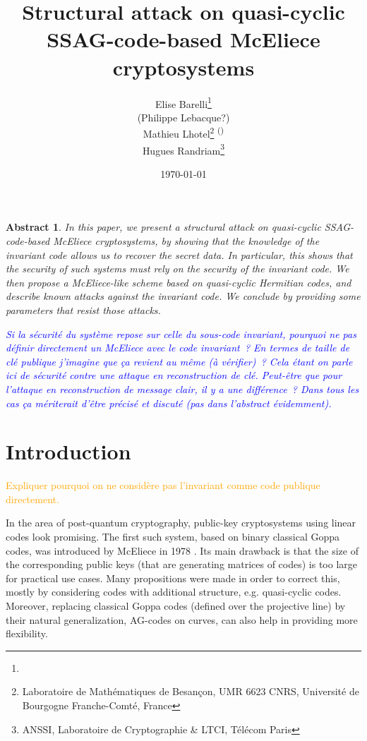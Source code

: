 \documentclass[10pt]{article}
\title{Structural attack on quasi-cyclic SSAG-code-based McEliece cryptosystems}
\author{
Elise Barelli\footnote{}\\
(Philippe Lebacque?)\\
Mathieu Lhotel\footnote{Laboratoire de Mathématiques de Besançon, UMR 6623 CNRS, Université de Bourgogne Franche-Comté, France} \textsuperscript{(\Letter)}\\
Hugues Randriam\footnote{ANSSI, Laboratoire de Cryptographie \& LTCI, Télécom Paris}
}
\date{\today}
\newtheorem*{abs}{Abstract}
\theoremstyle{definition}
\theoremstyle{definition}
\theoremstyle{definition}
\newcommand{\s}{\vspace{0.3cm}}
\newcommand{\hugues}[1]{\textcolor{blue}{#1}}
\newcommand{\note}[1]{\textcolor{orange}{#1}}
\begin{document}
\maketitle

\begin{abs} 
 In this paper, we present a structural attack on quasi-cyclic SSAG-code-based McEliece cryptosystems, by showing that the knowledge of the invariant code allows us to recover the secret data. In particular, this shows that the security of such systems must rely on the security of the invariant code. We then propose a McEliece-like scheme based on quasi-cyclic Hermitian codes, and describe known attacks against the invariant code. We conclude by providing some parameters that resist those attacks.

\hugues{
Si la sécurité du système repose sur celle du sous-code invariant, pourquoi ne pas définir directement un McEliece avec le code invariant~?
En termes de taille de clé publique j'imagine que ça revient au même (à vérifier)~?
Cela étant on parle ici de sécurité contre une attaque en reconstruction de clé.
Peut-être que pour l'attaque en reconstruction de message clair, il y a une différence~?
Dans tous les cas ça mériterait d'être précisé et discuté (pas dans l'abstract évidemment).
}
\end{abs}

\newpage



\section{Introduction}

\note{Expliquer pourquoi on ne considère pas l'invariant comme code publique directement.}

\s
In the area of post-quantum cryptography, public-key cryptosystems using linear codes look promising. The first such system, based on binary classical Goppa codes, was introduced by McEliece in 1978 \cite{McE}. Its main drawback is that the size of the corresponding public keys (that are generating matrices of codes) is too large for practical use cases. Many propositions were made in order to correct this, mostly by considering codes with additional structure, e.g. quasi-cyclic codes. Moreover, replacing classical Goppa codes (defined over the projective line) by their natural generalization, AG-codes on curves, can also help in providing more flexibility. 

\s
\end{document}
